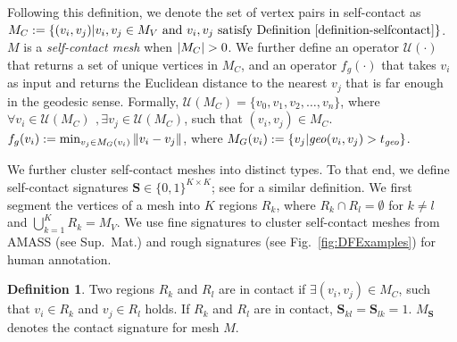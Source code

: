 \documentclass[final]{cvpr}
\newcommand{\suppmat}{Sup.~Mat.\xspace}
\newcommand{\geoth}{t_{\mathit{geo}}}
\theoremstyle{definition}
\newtheorem{definition}{Definition}[section]
\begin{document}
Following this definition, we denote the set of vertex pairs in self-contact as $\mathnormal{M}_C := \{(v_i, v_j) | v_i, v_j \in M_V \text{ and } v_i, v_j \text{ satisfy Definition~\ref{definition-selfcontact}}\}$.  $M$ is a \textit{self-contact mesh} when $|\mathnormal{M}_C| > 0$. We further define an operator $\mathcal{U}(\cdot)$ that returns a set of unique vertices in $M_C$, and an operator $f_g(\cdot)$ that takes $v_i$ as input and returns the Euclidean distance to the nearest $v_j$ that is far enough in the geodesic sense. 
Formally, $\mathcal{U}(M_C)=\{v_0, v_1, v_2, \dots, v_n\}$, where $\forall v_i \in \mathcal{U}(M_C)\,\ , \exists v_j \in \mathcal{U}(M_C)$, such that $(v_i,v_j) \in M_C$. $f_{g}(v_i) := \min_{v_j \in \mathnormal{M}_{G}(v_i)} \left\|  v_i - v_j\right\| $, where $\mathnormal{M}_{G}(v_i) := \{v_j | \mathit{geo}(v_i,v_j) > \geoth\}$.


We further cluster self-contact meshes into distinct types.
To that end, we define self-contact signatures $\mathbf {S} \in \{0,1\}^{K \times K}$;
see \cite{Fieraru_2021_AAAI} for a similar definition.
We first segment
the vertices of a mesh into $K$ regions $R_k$, where  $R_k \cap R_l = \emptyset$ for $k \neq l$ and $ \bigcup_{k=1}^{K} R_k = M_V $.
We use fine signatures to cluster self-contact meshes from AMASS (see \suppmat) and rough signatures
(see Fig.~\ref{fig:DFExamples}) for human annotation.
\begin{definition}
\label{definition-signature}
Two regions $R_k$ and $R_l$ are in contact if $\exists (v_i, v_j) \in M_C$, such that $v_i \in R_k$ and $v_j \in R_l$ holds. If $R_k$ and $R_l$ are in contact, $\mathbf{S}_{kl} = \mathbf{S}_{lk} = 1$. $M_\mathbf{S}$ denotes the contact signature for mesh $M$. 
\end{definition}
\end{document}
